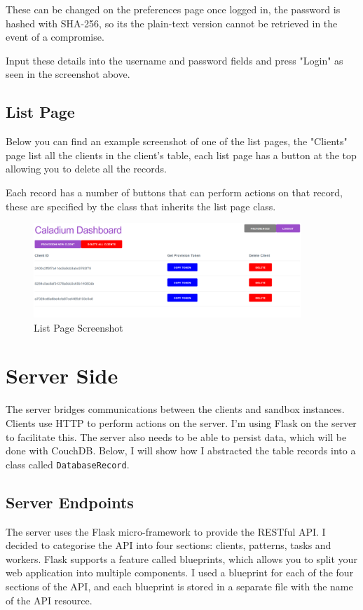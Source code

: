 These can be changed on the preferences page once logged in,
the password is hashed with SHA-256, so its
the plain-text version cannot be retrieved in the event of a compromise.

Input these details into the username and password fields
and press "Login" as seen in the screenshot above.

\subsection{List Page}
Below you can find an example screenshot of one of the list pages,
the "Clients" page list all the clients in the client's table,
each list page has a button at the top allowing you to delete all the records.

Each record has a number of buttons that can perform actions on that record,
these are specified by the class that inherits the list page class.

\begin{figure}[h!]
    \centering
    \includegraphics[width=0.9\textwidth]{images/screenshots/list_page}
    \caption{List Page Screenshot}
    \label{image:listPageScreenshot}
\end{figure}

\section{Server Side}
The server bridges communications between the clients and sandbox instances.
Clients use HTTP to perform actions on the server.
I'm using Flask on the server to facilitate this.
The server also needs to be able to persist data,
which will be done with CouchDB.
Below, I will show how I abstracted the table
records into a class called \texttt{DatabaseRecord}.

\subsection{Server Endpoints}
The server uses the Flask micro-framework to provide the RESTful API.
I decided to categorise the API into four sections:
clients, patterns, tasks and workers.
Flask supports a feature called blueprints,
which allows you to split your web application into multiple components.
I used a blueprint for each of the four sections of the API,
and each blueprint is stored in a separate file
with the name of the API resource.

